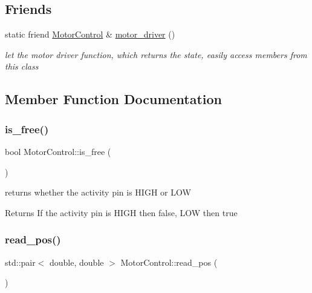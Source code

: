 \subsection*{Friends}
\begin{DoxyCompactItemize}
\item 
\mbox{\label{structMotorControl_a039b582e86435db0881e066f0b7a89b8}} 
static friend \mbox{\hyperlink{structMotorControl}{Motor\+Control}} \& \mbox{\hyperlink{structMotorControl_a039b582e86435db0881e066f0b7a89b8}{motor\+\_\+driver}} ()
\begin{DoxyCompactList}\small\item\em let the motor driver function, which returns the state, easily access members from this class \end{DoxyCompactList}\end{DoxyCompactItemize}


\subsection{Member Function Documentation}
\mbox{\label{structMotorControl_a9de35f14006d017df36b62d2c904249c}} 
\subsubsection{\texorpdfstring{is\+\_\+free()}{is\_free()}}
{\footnotesize\ttfamily bool Motor\+Control\+::is\+\_\+free (\begin{DoxyParamCaption}{ }\end{DoxyParamCaption})}



returns whether the activity pin is H\+I\+GH or L\+OW 

\begin{DoxyReturn}{Returns}
If the activity pin is H\+I\+GH then false, L\+OW then true 
\end{DoxyReturn}
\mbox{\label{structMotorControl_ace9edcee1a69c1d56e2af842e2fd3b1a}} 
\subsubsection{\texorpdfstring{read\+\_\+pos()}{read\_pos()}}
{\footnotesize\ttfamily std\+::pair$<$ double, double $>$ Motor\+Control\+::read\+\_\+pos (\begin{DoxyParamCaption}{ }\end{DoxyParamCaption})}



